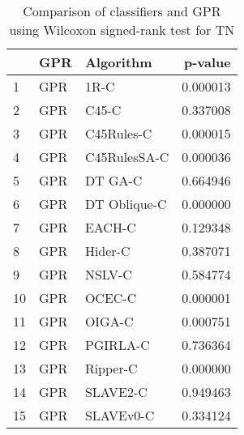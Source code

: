 \begin{table}
\footnotesize
\caption{Comparison of classifiers and GPR using Wilcoxon signed-rank test for TN}
\label{tab:GPR wilcoxon TN comparison}
\begin{tabular}{lllr}
\hline
 & GPR & Algorithm & p-value \\
\hline
1 & GPR & 1R-C & 0.000013 \\
2 & GPR & C45-C & 0.337008 \\
3 & GPR & C45Rules-C & 0.000015 \\
4 & GPR & C45RulesSA-C & 0.000036 \\
5 & GPR & DT GA-C & 0.664946 \\
6 & GPR & DT Oblique-C & 0.000000 \\
7 & GPR & EACH-C & 0.129348 \\
8 & GPR & Hider-C & 0.387071 \\
9 & GPR & NSLV-C & 0.584774 \\
10 & GPR & OCEC-C & 0.000001 \\
11 & GPR & OIGA-C & 0.000751 \\
12 & GPR & PGIRLA-C & 0.736364 \\
13 & GPR & Ripper-C & 0.000000 \\
14 & GPR & SLAVE2-C & 0.949463 \\
15 & GPR & SLAVEv0-C & 0.334124 \\
\hline
\end{tabular}
\end{table}
